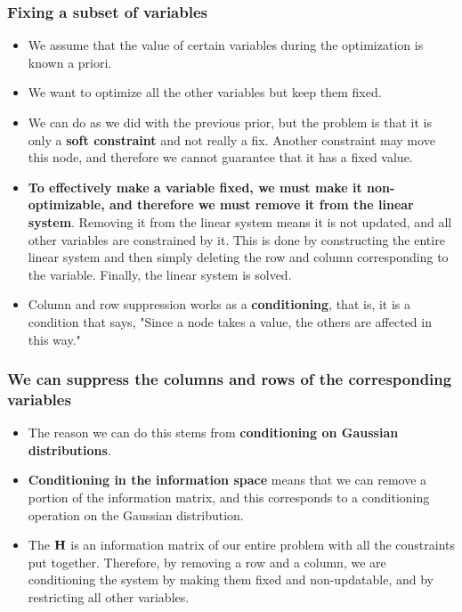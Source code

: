     \begin{frame}
    \frametitle{Fixing a subset of variables}
    
    \begin{itemize}
    \item We assume that the value of certain variables during the optimization is known a priori.
    \item We want to optimize all the other variables but keep them fixed.
    \item We can do as we did with the previous prior, but the problem is that it is only a {\bf soft constraint} and not really a fix. Another constraint may move this node, and therefore we cannot guarantee that it has a fixed value.
    \item \textbf{To effectively make a variable fixed, we must make it non-optimizable, and therefore we must remove it from the linear system}. Removing it from the linear system means it is not updated, and all other variables are constrained by it. This is done by constructing the entire linear system and then simply deleting the row and column corresponding to the variable. Finally, the linear system is solved. \item Column and row suppression works as a {\bf conditioning}, that is, it is a condition that says, "Since a node takes a value, the others are affected in this way."
    
    \end{itemize}
    
    \end{frame}
    
    \begin{frame}
    \frametitle{We can suppress the columns and rows of the corresponding variables}
    
    \begin{itemize}
    \item The reason we can do this stems from {\bf conditioning on Gaussian distributions}.
    \item {\bf Conditioning in the information space} means that we can remove a portion of the information matrix, and this corresponds to a conditioning operation on the Gaussian distribution.
    \item The $\boldsymbol{\mathbf{H}}$ is an information matrix of our entire problem with all the constraints put together. Therefore, by removing a row and a column, we are conditioning the system by making them fixed and non-updatable, and by restricting all other variables.
    \end{itemize}
    
    
\end{frame}

